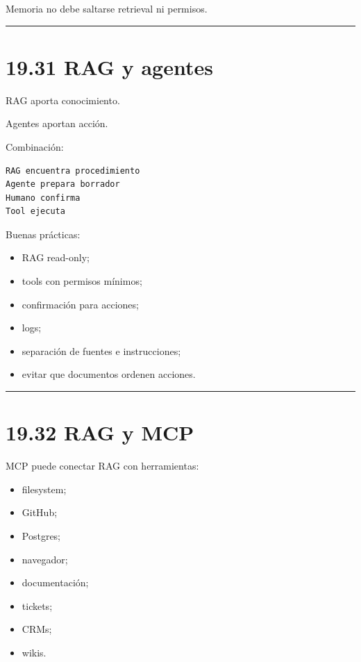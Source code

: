 Memoria no debe saltarse retrieval ni permisos.

\begin{center}\rule{0.5\linewidth}{0.5pt}\end{center}

\section{19.31 RAG y agentes}\label{rag-y-agentes}

RAG aporta conocimiento.

Agentes aportan acción.

Combinación:

\begin{lstlisting}
RAG encuentra procedimiento
Agente prepara borrador
Humano confirma
Tool ejecuta
\end{lstlisting}

Buenas prácticas:

\begin{itemize}
\tightlist
\item
  RAG read-only;
\item
  tools con permisos mínimos;
\item
  confirmación para acciones;
\item
  logs;
\item
  separación de fuentes e instrucciones;
\item
  evitar que documentos ordenen acciones.
\end{itemize}

\begin{center}\rule{0.5\linewidth}{0.5pt}\end{center}

\section{19.32 RAG y MCP}\label{rag-y-mcp}

MCP puede conectar RAG con herramientas:

\begin{itemize}
\tightlist
\item
  filesystem;
\item
  GitHub;
\item
  Postgres;
\item
  navegador;
\item
  documentación;
\item
  tickets;
\item
  CRMs;
\item
  wikis.
\end{itemize}

